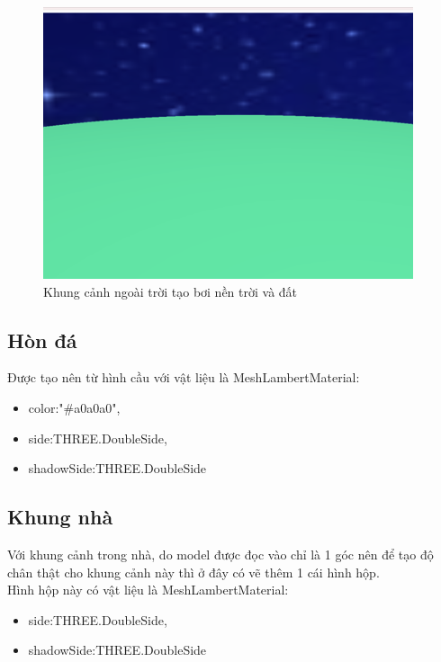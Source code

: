 \begin{center}
    \begin{figure}[!h]
        \centering
        \includegraphics[scale = 1]{contents/night.png}
        \caption{Khung cảnh ngoài trời tạo bơi nền trời và đất}
    \end{figure}
\end{center}

\subsection{Hòn đá}
Được tạo nên từ hình cầu với vật liệu là MeshLambertMaterial:
\begin{itemize}
    \item color:"\#a0a0a0", 
     \item     side:THREE.DoubleSide,
    \item         shadowSide:THREE.DoubleSide
\end{itemize}


\subsection{Khung nhà}
Với khung cảnh trong nhà, do model được đọc vào chỉ là 1 góc nên để tạo độ chân thật cho khung cảnh này thì ở đây có vẽ thêm 1 cái hình hộp.\\

Hình hộp này có vật liệu là MeshLambertMaterial:
\begin{itemize}
    \item side:THREE.DoubleSide,
    \item shadowSide:THREE.DoubleSide
\end{itemize}
